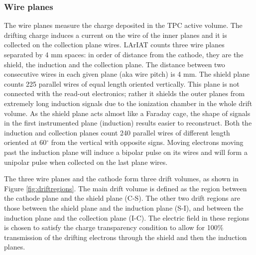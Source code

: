 \subsubsection{Wire planes}
The wire planes measure the charge deposited in the TPC active volume. The drifting charge induces a current on the wire of the inner planes and it is collected on the collection plane wires.
LArIAT counts three wire planes separated by 4 mm spaces: in order of distance from the cathode, they are the shield, the induction and the collection plane. The distance between two consecutive wires in each given plane (aka wire pitch) is 4 mm.  The shield plane counts 225 parallel wires of equal length oriented vertically. This plane is not connected with the read-out electronics; rather it shields the outer planes from extremely long induction signals due to the ionization chamber in the whole drift volume. As the shield plane acts almost like a Faraday cage, the shape of signals in the first instrumented plane (induction)  results easier to reconstruct.  Both the induction and collection planes count 240 parallel wires of different length oriented at 60$^\circ$ from the vertical with opposite signs.
Moving electrons moving past the induction plane will induce a bipolar pulse on its wires and will form a unipolar pulse when collected on the last plane wires. 

The three wire planes and the cathode form three drift volumes, as shown in Figure \ref{fig:driftregions}. 
The main drift volume is defined as the region between the cathode plane and the shield plane (C-S). The other two drift regions are those between the shield plane and the induction plane (S-I), and between the induction plane and the collection plane (I-C). The electric field in these regions is chosen to satisfy the charge transparency condition to allow for 100$\%$ transmission of the drifting electrons through the shield and then the induction planes. 

